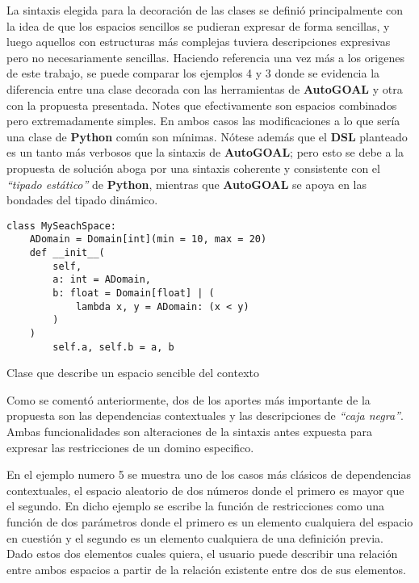La sintaxis elegida para la decoración de las clases se definió principalmente con la idea de
que los espacios sencillos se pudieran expresar de forma sencillas, y luego aquellos con estructuras más
complejas tuviera descripciones expresivas pero no necesariamente sencillas.
\newpage
Haciendo referencia una vez
más a los origenes de este trabajo, se puede comparar los ejemplos 4 y 3 donde se
evidencia la diferencia entre una clase decorada con las herramientas de {\bf AutoGOAL} y otra con la propuesta
presentada. Notes que efectivamente son espacios combinados pero extremadamente simples. En ambos casos las
modificaciones a lo que sería una clase de {\bf Python} común son mínimas. Nótese además que el {\bf DSL}
planteado es un tanto más verbosos que la sintaxis de {\bf AutoGOAL}; pero esto se debe a la propuesta de solución
aboga por una sintaxis coherente y consistente con el {\it “tipado estático”} de {\bf Python}, mientras que
    {\bf AutoGOAL} se apoya en las bondades del tipado dinámico.



\begin{listing}[!ht]
    \begin{verbatim}
class MySeachSpace:
    ADomain = Domain[int](min = 10, max = 20)
    def __init__(
        self, 
        a: int = ADomain,
        b: float = Domain[float] | (
            lambda x, y = ADomain: (x < y)
        )
    )
        self.a, self.b = a, b

    \end{verbatim}
    \caption{Clase que describe un espacio sencible del contexto}
    \label{ex:class_dep}
\end{listing}

Como se comentó anteriormente, dos de los aportes más importante de la propuesta son las dependencias
contextuales y las descripciones de {\it “caja negra”}. Ambas funcionalidades son alteraciones de la sintaxis
antes expuesta para expresar las restricciones de un domino especifico.

En el ejemplo numero 5 se muestra
uno de los casos más clásicos de dependencias contextuales, el espacio aleatorio de dos números donde el
primero es mayor que el segundo. En dicho ejemplo se escribe la función de restricciones como una función
de dos parámetros donde el primero es un elemento cualquiera del espacio en cuestión y el segundo es un
elemento cualquiera de una definición previa. Dado estos dos elementos cuales quiera, el usuario puede
describir una relación entre ambos espacios a partir de la relación existente entre dos de sus elementos.

